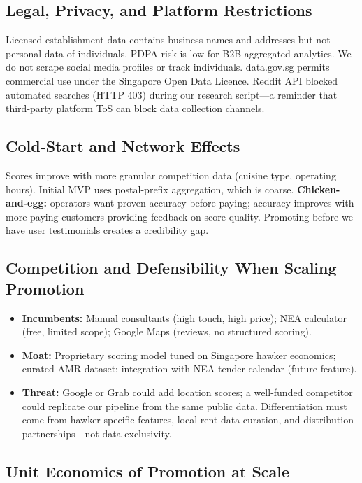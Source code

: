 \documentclass[11pt,a4paper]{article}
\begin{document}
\subsection{Legal, Privacy, and Platform Restrictions}

Licensed establishment data contains business names and addresses but not personal data of individuals. PDPA risk is low for B2B aggregated analytics. We do not scrape social media profiles or track individuals. data.gov.sg permits commercial use under the Singapore Open Data Licence. Reddit API blocked automated searches (HTTP 403) during our research script---a reminder that third-party platform ToS can block data collection channels.

\subsection{Cold-Start and Network Effects}

Scores improve with more granular competition data (cuisine type, operating hours). Initial MVP uses postal-prefix aggregation, which is coarse. \textbf{Chicken-and-egg:} operators want proven accuracy before paying; accuracy improves with more paying customers providing feedback on score quality. Promoting before we have user testimonials creates a credibility gap.

\subsection{Competition and Defensibility When Scaling Promotion}

\begin{itemize}
  \item \textbf{Incumbents:} Manual consultants (high touch, high price); NEA calculator (free, limited scope); Google Maps (reviews, no structured scoring).
  \item \textbf{Moat:} Proprietary scoring model tuned on Singapore hawker economics; curated AMR dataset; integration with NEA tender calendar (future feature).
  \item \textbf{Threat:} Google or Grab could add location scores; a well-funded competitor could replicate our pipeline from the same public data. Differentiation must come from hawker-specific features, local rent data curation, and distribution partnerships---not data exclusivity.
\end{itemize}

\subsection{Unit Economics of Promotion at Scale}
\end{document}
